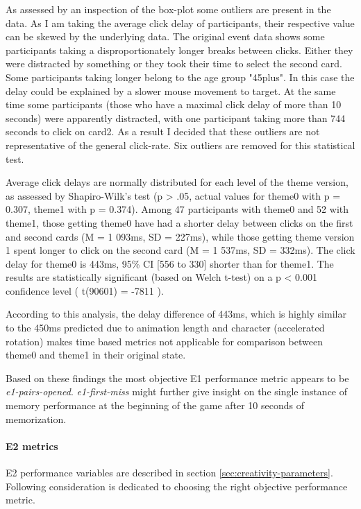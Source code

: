 	As assessed by an inspection of the box-plot some outliers are present in the data. As I am taking the average click delay of participants, their respective value can be skewed by the underlying data. The original event data shows some participants taking a disproportionately longer breaks between clicks. Either they were distracted by something or they took their time to select the second card. Some participants taking longer belong to the age group "45plus". In this case the delay could be explained by a slower mouse movement to target. At the same time some participants (those who have a maximal click delay of more than 10 seconds) were apparently distracted, with one participant taking more than 744 seconds to click on card2. As a result I decided that these outliers are not representative of the general click-rate. Six outliers are removed for this statistical test.
	
	Average click delays are normally distributed for each level of the theme version, as assessed by Shapiro-Wilk's test (p > .05, actual values for theme0 with p = 0.307, theme1 with p = 0.374). Among 47 participants with theme0 and 52 with theme1, those getting theme0 have had a shorter delay between clicks on the first and second cards (M = 1 093ms, SD = 227ms), while those getting theme version 1 spent longer to click on the second card (M = 1 537ms, SD = 332ms). The click delay for theme0 is 443ms, 95\% CI [556 to 330] shorter than for theme1. The results are statistically significant (based on Welch t-test) on a p < 0.001 confidence level ( t(90601) = -7811 ).
	
	According to this analysis, the delay difference of 443ms, which is highly similar to the 450ms predicted due to animation length and character (accelerated rotation) makes time based metrics not applicable for comparison between theme0 and theme1 in their original state.
	
	Based on these findings the most objective E1 performance metric appears to be \textit{e1-pairs-opened}.
	\textit{e1-first-miss} might further give insight on the single instance of memory performance at the beginning of the game after 10 seconds of memorization.
	
	\paragraph{E2 metrics}
	
	E2 performance variables are described in section \ref{sec:creativity-parameters}. Following consideration is dedicated to choosing the right objective performance metric.
	
